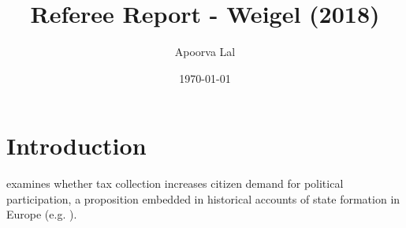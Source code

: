 \documentclass[12pt,reqno]{amsart} %
\title{Referee Report - Weigel (2018)}
\author{Apoorva Lal}
\date{\today}
\begin{document}
\maketitle



\section{Introduction} \label{intro}

\textcite{weigelBuildingStateCitizen2018} examines whether tax
collection increases citizen demand for political participation, a
proposition embedded in historical accounts of state formation in
Europe (e.g. \textcite{northConstitutionsCommitmentEvolution1989}).

\renewcommand{\mkbibnamefamily}[1]{\textsc{#1}}
\printbibliography

\appendix

\end{document}
